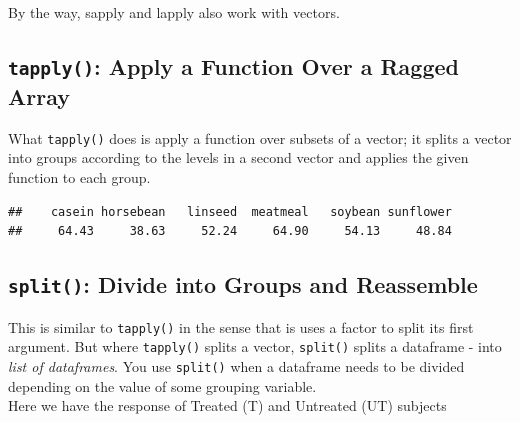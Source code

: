 \documentclass[]{book}
\newenvironment{Shaded}{\begin{snugshade}}{\end{snugshade}}
\newcommand{\DataTypeTok}[1]{\textcolor[rgb]{0.13,0.29,0.53}{#1}}
\newcommand{\KeywordTok}[1]{\textcolor[rgb]{0.13,0.29,0.53}{\textbf{#1}}}
\newcommand{\NormalTok}[1]{#1}
\newcommand{\OperatorTok}[1]{\textcolor[rgb]{0.81,0.36,0.00}{\textbf{#1}}}
\begin{document}
By the way, sapply and lapply also work with vectors.

\hypertarget{tapply-apply-a-function-over-a-ragged-array}{%
\subsection{\texorpdfstring{\texttt{tapply()}: Apply a Function Over a Ragged Array}{tapply(): Apply a Function Over a Ragged Array}}\label{tapply-apply-a-function-over-a-ragged-array}}

What \texttt{tapply()} does is apply a function over subsets of a vector; it splits a vector into groups according to the levels in a second vector and applies the given function to each group.

\begin{Shaded}
\end{Shaded}

\begin{verbatim}
##    casein horsebean   linseed  meatmeal   soybean sunflower 
##     64.43     38.63     52.24     64.90     54.13     48.84
\end{verbatim}

\hypertarget{split-divide-into-groups-and-reassemble}{%
\subsection{\texorpdfstring{\texttt{split()}: Divide into Groups and Reassemble}{split(): Divide into Groups and Reassemble}}\label{split-divide-into-groups-and-reassemble}}

This is similar to \texttt{tapply()} in the sense that is uses a factor to split its first argument. But where \texttt{tapply()} splits a vector, \texttt{split()} splits a dataframe - into \emph{list of dataframes}.
You use \texttt{split()} when a dataframe needs to be divided depending on the value of some grouping variable.\\
Here we have the response of Treated (T) and Untreated (UT) subjects
\end{document}
